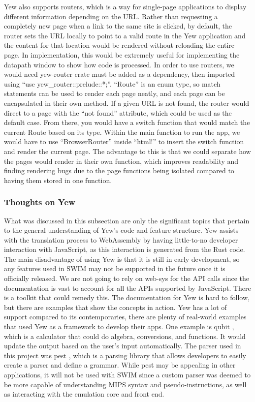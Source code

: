 \documentclass[
    paper=letter,
    parskip=half,
    fontsize=12pt,
    titlepage=firstiscover,
    toc=bibliography,
    numbers=endperiod
]{scrartcl}
\begin{document}
Yew also supports routers, which is a way for single-page applications
to display different information depending on the URL. Rather than
requesting a completely new page when a link to the same site is
clicked, by default, the router sets the URL locally to point to a valid
route in the Yew application and the content for that location would be
rendered without reloading the entire page. In implementation, this
would be extremely useful for implementing the datapath window to show
how code is processed. In order to use routers, we would need yew-router
crate must be added as a dependency, then imported using ``use
yew\_router::prelude::*;''. ``Route'' is an enum type, so match
statements can be used to render each page neatly, and each page can be
encapsulated in their own method. If a given URL is not found, the
router would direct to a page with the ``not found'' attribute,
which could be used as the default case. From there, you would have a switch
function that would match the current Route based on its type. Within
the main function to run the app, we would have to use ``BrowserRouter'' inside ``html!'' to
insert the switch function and render the current page. The advantage to this is that
we could separate how the pages would render in their own function,
which improves readability and finding rendering bugs due to the
page functions being isolated compared to having them stored in one function.


\subsubsection{Thoughts on Yew}

What was discussed in this subsection are only the significant topics
that pertain to the general understanding of Yew's code and feature
structure. Yew assists with the translation process to WebAssembly by
having little-to-no developer interaction with JavaScript, as this
interaction is generated from the Rust code. The main disadvantage of
using Yew is that it is still in early development, so any features used
in SWIM may not be supported in the future once it is officially
released. We are not going to rely on web-sys for the API
calls since the documentation is vast to account for all the APIs
supported by JavaScript. There is a toolkit that could remedy
this. The documentation for Yew is hard to follow, but there are
examples that show the concepts in action. Yew has a lot of support
compared to its contemporaries, there are plenty of real-world examples
that used Yew as a framework to develop their apps. One example is
qubit \cite{qubit}, which is a calculator that could do algebra, conversions, and
functions. It would update the output based on the
user's input automatically. The parser used in this
project was pest \cite{pest}, which is a parsing library that allows developers to
easily create a parser and define a grammar. While pest may be appealing
in other applications, it will not be used with SWIM since a custom
parser was deemed to be more capable of understanding MIPS syntax and
pseudo-instructions, as well as interacting with the emulation core and
front end.
\end{document}
